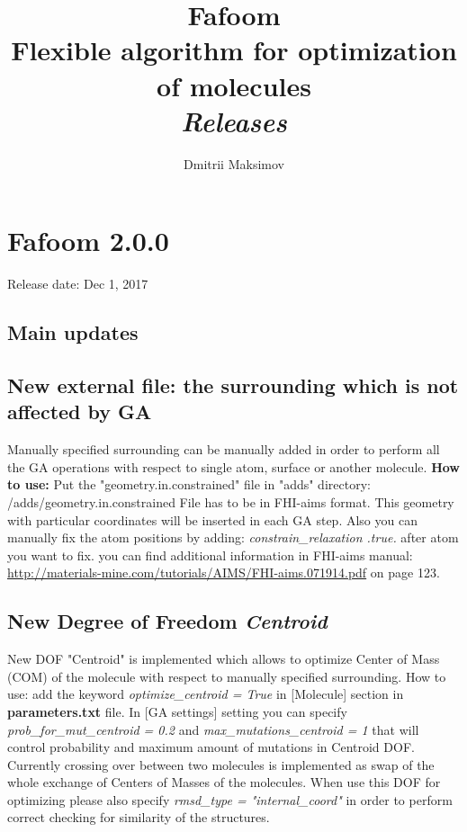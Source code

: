 \documentclass[a4paper]{article}
\title{\textbf{Fafoom}\\Flexible algorithm for optimization of molecules \\ \textit{Releases}}
\author{Dmitrii Maksimov}
\begin{document}
\maketitle

\tableofcontents
\newpage
\section{Fafoom 2.0.0}
Release date: Dec 1, 2017
\subsection*{Main updates}
\subsection{New external file: the surrounding which is not affected by GA} 
Manually specified surrounding can be manually added in order to perform all the GA operations with respect to single atom, surface or another molecule. \newline
\textbf{How to use:}\newline
Put the "geometry.in.constrained" file in "adds" directory: /adds/geometry.in.constrained \newline
File has to be in FHI-aims format. This geometry with particular coordinates will be inserted in each GA step. Also you can manually fix the atom positions by adding:\newline
\textit{constrain\_relaxation .true.} after atom you want to fix.\newline
you can find additional information in FHI-aims manual:\newline
\href{http://materials-mine.com/tutorials/AIMS/FHI-aims.071914.pdf}{http://materials-mine.com/tutorials/AIMS/FHI-aims.071914.pdf} on page 123.
\subsection{\textbf{New Degree of Freedom} \textit{Centroid}}
New DOF "Centroid" is implemented which allows to optimize Center of Mass (COM) of the molecule with respect to manually specified surrounding. How to use:\newline
add the keyword \textit{optimize\_centroid = True} in [Molecule] section in \textbf{parameters.txt} file. In [GA settings] setting you can specify \textit{prob\_for\_mut\_centroid = 0.2} and \textit{max\_mutations\_centroid = 1} that will control probability and maximum amount of mutations in Centroid DOF. Currently crossing over between two molecules is implemented as swap of the whole exchange of Centers of Masses of the molecules. When use this DOF for optimizing please also specify \textit{rmsd\_type = "internal\_coord"} in order to perform correct checking for similarity of the structures.
\end{document}
